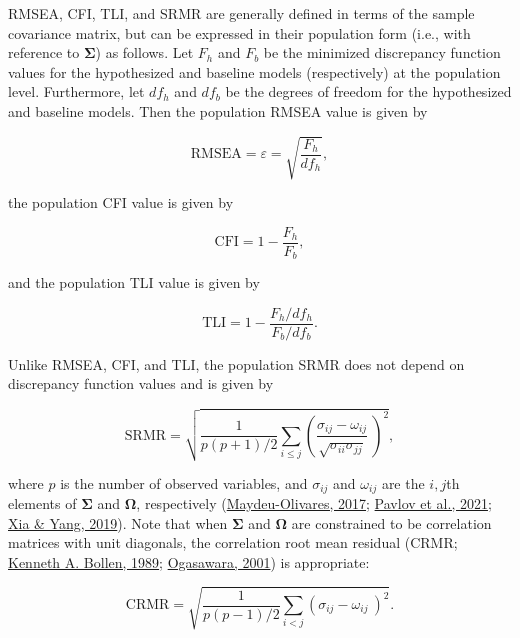 \documentclass[11pt]{umnthesis}
\begin{document}
RMSEA, CFI, TLI, and SRMR are generally defined in terms of the sample covariance matrix, but can be expressed in their population form (i.e., with reference to \(\bm{\Sigma}\)) as follows. Let \(F_h\) and \(F_b\) be the minimized discrepancy function values for the hypothesized and baseline models (respectively) at the population level. Furthermore, let \(df_h\) and \(df_b\) be the degrees of freedom for the hypothesized and baseline models. Then the population RMSEA value is given by

\begin{equation}
\textrm{RMSEA} = \varepsilon = \sqrt{\frac{F_h}{df_h}},
\end{equation}

\noindent the population CFI value is given by

\begin{equation}
\textrm{CFI} = 1 - \frac{F_h}{F_b},
\end{equation}

\noindent and the population TLI value is given by

\begin{equation} 
\textrm{TLI} = 1 - \frac{F_h / df_h}{F_b / df_b}.
\end{equation}

\noindent Unlike RMSEA, CFI, and TLI, the population SRMR does not depend on discrepancy function values and is given by

\begin{equation}
\textrm{SRMR} = \sqrt{ \frac{1}{p (p + 1) / 2} \sum_{i \leq j} \left(  \frac{\sigma_{ij} - \omega_{ij}}{\sqrt{\sigma_{ii} \sigma_{jj}}} \ \right) ^2 },
\end{equation}

\noindent where \(p\) is the number of observed variables, and \(\sigma_{ij}\) and \(\omega_{ij}\) are the \(i,j\)th elements of \(\bm{\Sigma}\) and \(\bm{\Omega}\), respectively (\protect\hyperlink{ref-maydeu-olivares2017}{Maydeu-Olivares, 2017}; \protect\hyperlink{ref-pavlov2021}{Pavlov et al., 2021}; \protect\hyperlink{ref-xia2019}{Xia \& Yang, 2019}). Note that when \(\bm{\Sigma}\) and \(\bm{\Omega}\) are constrained to be correlation matrices with unit diagonals, the correlation root mean residual (CRMR; \protect\hyperlink{ref-bollen1989a}{Kenneth A. Bollen, 1989}; \protect\hyperlink{ref-ogasawara2001}{Ogasawara, 2001}) is appropriate:

\begin{equation}
\textrm{CRMR} = \sqrt{ \frac{1}{p (p - 1) / 2} \sum_{i < j} \left( \sigma_{ij} - \omega_{ij} \ \right) ^2 }.
\end{equation}
\end{document}

